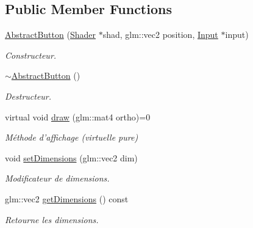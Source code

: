 \subsection*{Public Member Functions}
\begin{DoxyCompactItemize}
\item 
\hypertarget{classAbstractButton_a1e6fec84d19280e39f0b4380b9de6029}{\hyperlink{classAbstractButton_a1e6fec84d19280e39f0b4380b9de6029}{Abstract\+Button} (\hyperlink{classShader}{Shader} $\ast$shad, glm\+::vec2 position, \hyperlink{classInput}{Input} $\ast$input)}\label{classAbstractButton_a1e6fec84d19280e39f0b4380b9de6029}

\begin{DoxyCompactList}\small\item\em Constructeur. \end{DoxyCompactList}\item 
\hypertarget{classAbstractButton_ae3d97004edc96ee5ccf9719df9c2458a}{\hyperlink{classAbstractButton_ae3d97004edc96ee5ccf9719df9c2458a}{$\sim$\+Abstract\+Button} ()}\label{classAbstractButton_ae3d97004edc96ee5ccf9719df9c2458a}

\begin{DoxyCompactList}\small\item\em Destructeur. \end{DoxyCompactList}\item 
\hypertarget{classAbstractButton_ad306c40d3966ae3d2187c88b426a1082}{virtual void \hyperlink{classAbstractButton_ad306c40d3966ae3d2187c88b426a1082}{draw} (glm\+::mat4 ortho)=0}\label{classAbstractButton_ad306c40d3966ae3d2187c88b426a1082}

\begin{DoxyCompactList}\small\item\em Méthode d'affichage (virtuelle pure) \end{DoxyCompactList}\item 
\hypertarget{classAbstractButton_a328cfee71f7ef2cced5b8b79e27f81e9}{void \hyperlink{classAbstractButton_a328cfee71f7ef2cced5b8b79e27f81e9}{set\+Dimensions} (glm\+::vec2 dim)}\label{classAbstractButton_a328cfee71f7ef2cced5b8b79e27f81e9}

\begin{DoxyCompactList}\small\item\em Modificateur de dimensions. \end{DoxyCompactList}\item 
\hypertarget{classAbstractButton_ab5e449bb4bd6a848c7dcd58b0644b0ec}{glm\+::vec2 \hyperlink{classAbstractButton_ab5e449bb4bd6a848c7dcd58b0644b0ec}{get\+Dimensions} () const }\label{classAbstractButton_ab5e449bb4bd6a848c7dcd58b0644b0ec}

\begin{DoxyCompactList}\small\item\em Retourne les dimensions. \end{DoxyCompactList}\end{DoxyCompactItemize}
